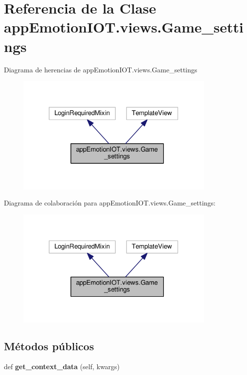 \hypertarget{classappEmotionIOT_1_1views_1_1Game__settings}{}\section{Referencia de la Clase app\+Emotion\+I\+O\+T.\+views.\+Game\+\_\+settings}
\label{classappEmotionIOT_1_1views_1_1Game__settings}


Diagrama de herencias de app\+Emotion\+I\+O\+T.\+views.\+Game\+\_\+settings
\nopagebreak
\begin{figure}[H]
\begin{center}
\leavevmode
\includegraphics[width=279pt]{classappEmotionIOT_1_1views_1_1Game__settings__inherit__graph}
\end{center}
\end{figure}


Diagrama de colaboración para app\+Emotion\+I\+O\+T.\+views.\+Game\+\_\+settings\+:
\nopagebreak
\begin{figure}[H]
\begin{center}
\leavevmode
\includegraphics[width=279pt]{classappEmotionIOT_1_1views_1_1Game__settings__coll__graph}
\end{center}
\end{figure}
\subsection*{Métodos públicos}
\begin{DoxyCompactItemize}
\item 
def {\bfseries get\+\_\+context\+\_\+data} (self, kwargs)\hypertarget{classappEmotionIOT_1_1views_1_1Game__settings_ad390b86a6c2cc795819c9e8cba0ff257}{}\label{classappEmotionIOT_1_1views_1_1Game__settings_ad390b86a6c2cc795819c9e8cba0ff257}

\end{DoxyCompactItemize}
